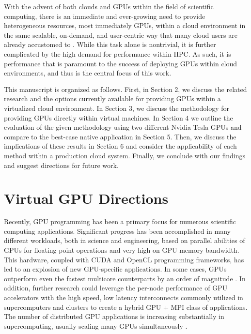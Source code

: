 With the advent of both clouds and GPUs within the field of scientific computing, there is an immediate and ever-growing need to provide heterogeneous resources, most immediately GPUs, within a cloud environment in the same scalable, on-demand, and user-centric way that many cloud users are already accustomed to \cite{crago2011heterogeneous}.  While this task alone is nontrivial, it is further complicated by the high demand for performance within HPC.  As such, it is performance that is paramount to the success of deploying GPUs within cloud environments, and thus is the central focus of this work.


This manuscript is organized as follows.  First, in Section 2, we discuss the related research and the options currently available for providing GPUs within a virtualized cloud environment.  In Section 3, we discuss the methodology for providing GPUs directly within virtual machines.  In Section 4 we outline the evaluation of the given methodology using two different Nvidia Tesla GPUs and compare to the best-case native application in Section 5. Then, we discuss the implications of these results in Section 6 and consider the applicability of each method within a production cloud system.  Finally, we conclude with our findings and suggest directions for future work.


\section{Virtual GPU Directions}

Recently, GPU programming has been a primary focus for numerous scientific computing applications. Significant progress has been accomplished in many different workloads, both in science and engineering, based on parallel abilities of GPUs for floating point operations and very high on-GPU memory bandwidth. This hardware, coupled with CUDA and OpenCL programming frameworks, has led to an explosion of new GPU-specific applications. In some cases,  GPUs outperform even the fastest multicore counterparts by an order of magnitude \cite{sanders2010cuda}.  In addition, further research could leverage the per-node performance of GPU accelerators with the high speed, low latency interconnects commonly utilized in supercomputers and clusters  to create a hybrid GPU + MPI class of applications. The number of distributed GPU applications is increasing substantially in supercomputing, usually scaling many GPUs simultaneously \cite{kindratenko2009gpu}. 


